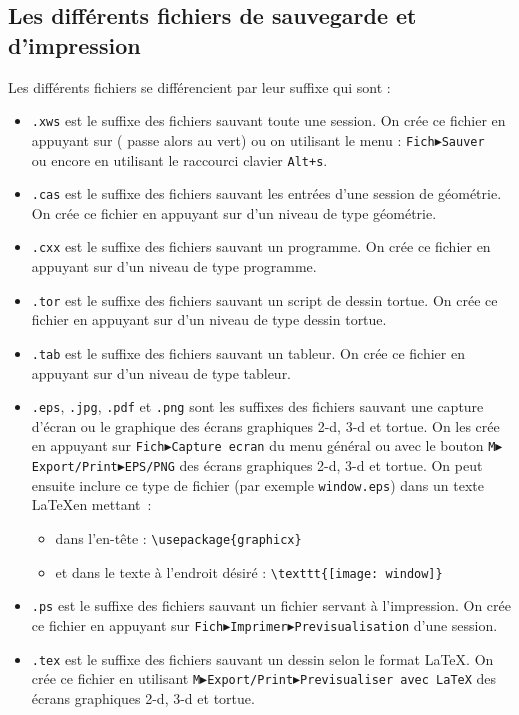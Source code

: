 \documentclass[a4paper,11pt]{article}
\begin{document}
\subsection{Les diff\'erents fichiers de sauvegarde et d'impression}
Les diff\'erents fichiers se diff\'erencient par leur suffixe qui sont :
\begin{itemize}
\item {\tt .xws} est le suffixe des fichiers sauvant toute une session. On 
cr\'ee ce fichier en appuyant sur  ( passe alors au vert) ou on utilisant le menu :
{\tt Fich$\blacktriangleright$Sauver} \\
ou encore en utilisant le raccourci clavier {\tt Alt+s}.
\item {\tt .cas} est le suffixe des fichiers sauvant les entr\'ees d'une 
session de g\'eom\'etrie. 
On cr\'ee ce fichier en appuyant sur  d'un niveau 
de type g\'eom\'etrie.
\item {\tt .cxx} est le suffixe des fichiers sauvant un programme. On cr\'ee ce
 fichier en appuyant sur  d'un niveau de type programme.
\item {\tt .tor} est le suffixe des fichiers sauvant un script de dessin
tortue. On cr\'ee ce fichier en appuyant sur  d'un niveau de
type dessin tortue.
\item {\tt .tab} est le suffixe des fichiers sauvant un tableur. On cr\'ee ce 
fichier en appuyant sur  d'un niveau de type tableur.
\item {\tt .eps}, {\tt .jpg}, {\tt .pdf}  et {\tt .png} sont les suffixes 
des fichiers sauvant une capture d'\'ecran ou 
le graphique des \'ecrans graphiques 2-d, 3-d et tortue. 
On les cr\'ee en appuyant sur {\tt Fich$\blacktriangleright$Capture 
ecran} du menu g\'en\'eral
ou avec le bouton 
{\tt M$\blacktriangleright$Export/Print$\blacktriangleright$EPS/PNG} 
des \'ecrans graphiques 2-d, 3-d et tortue.
On peut ensuite inclure ce type de fichier (par exemple {\tt window.eps})
dans un texte \LaTeX en mettant~:
\begin{itemize}
\item dans l'en-t\^ete :
\verb|\usepackage{graphicx} |
\item
et dans le texte \`a l'endroit d\'esir\'e :
\verb|\texttt{[image: window]}|
\end{itemize}
\item {\tt .ps} est le suffixe des fichiers sauvant un fichier servant \`a 
l'impression. On cr\'ee ce 
fichier en appuyant sur 
{\tt  Fich$\blacktriangleright$Imprimer$\blacktriangleright$Previsualisation} 
d'une session.
\item {\tt .tex} est le suffixe des fichiers sauvant un dessin selon le
format \LaTeX. On cr\'ee ce fichier en utilisant 
{\tt M$\blacktriangleright$Export/Print$\blacktriangleright$Previsualiser avec LaTeX} des \'ecrans graphiques 2-d, 3-d et tortue.
\end{itemize}
\end{document}
